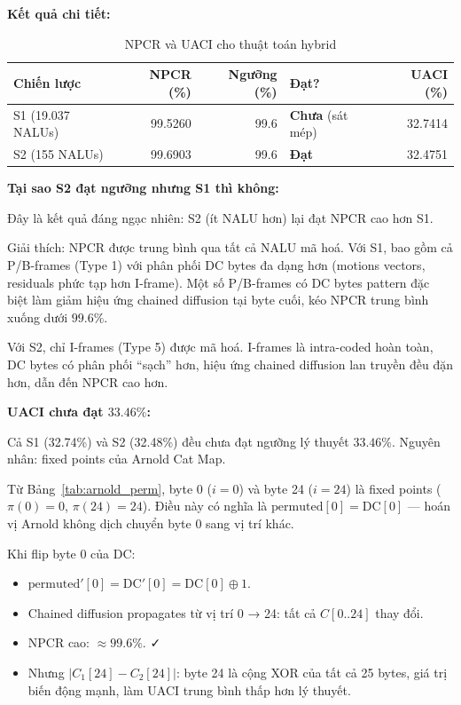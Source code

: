 \textbf{Kết quả chi tiết:}

\begin{table}[ht]
\centering
\caption{NPCR và UACI cho thuật toán hybrid}
\label{tab:npcr_detail}
\begin{tabular}{lrrlr}
\toprule
Chiến lược & NPCR (\%) & Ngưỡng (\%) & Đạt? & UACI (\%) \\
\midrule
S1 (19.037 NALUs) & 99.5260 & 99.6 & \textbf{Chưa} (sát mép) & 32.7414 \\
S2 (155 NALUs)    & 99.6903 & 99.6 & \textbf{Đạt} & 32.4751 \\
\bottomrule
\end{tabular}
\end{table}

\textbf{Tại sao S2 đạt ngưỡng nhưng S1 thì không:}

Đây là kết quả đáng ngạc nhiên: S2 (ít NALU hơn) lại đạt NPCR cao hơn S1.

Giải thích: NPCR được trung bình qua tất cả NALU mã hoá. Với S1, bao gồm cả
P/B-frames (Type 1) với phân phối DC bytes đa dạng hơn (motions vectors, residuals
phức tạp hơn I-frame). Một số P/B-frames có DC bytes pattern đặc biệt làm giảm
hiệu ứng chained diffusion tại byte cuối, kéo NPCR trung bình xuống dưới $99.6\%$.

Với S2, chỉ I-frames (Type 5) được mã hoá. I-frames là intra-coded hoàn toàn,
DC bytes có phân phối ``sạch'' hơn, hiệu ứng chained diffusion lan truyền đều đặn
hơn, dẫn đến NPCR cao hơn.

\textbf{UACI chưa đạt $33.46\%$:}

Cả S1 (32.74\%) và S2 (32.48\%) đều chưa đạt ngưỡng lý thuyết $33.46\%$.
Nguyên nhân: fixed points của Arnold Cat Map.

Từ Bảng~\ref{tab:arnold_perm}, byte 0 ($i=0$) và byte 24 ($i=24$) là fixed points
($\pi(0) = 0$, $\pi(24) = 24$). Điều này có nghĩa là $\text{permuted}[0] = \text{DC}[0]$
--- hoán vị Arnold không dịch chuyển byte 0 sang vị trí khác.

Khi flip byte 0 của DC:
\begin{itemize}
  \item $\text{permuted}'[0] = \text{DC}'[0] = \text{DC}[0] \oplus 1$.
  \item Chained diffusion propagates từ vị trí 0 → 24: tất cả $C[0..24]$ thay đổi.
  \item NPCR cao: $\approx 99.6\%$. ✓
  \item Nhưng $|C_1[24] - C_2[24]|$: byte 24 là cộng XOR của tất cả 25 bytes,
        giá trị biến động mạnh, làm UACI trung bình thấp hơn lý thuyết.
\end{itemize}

